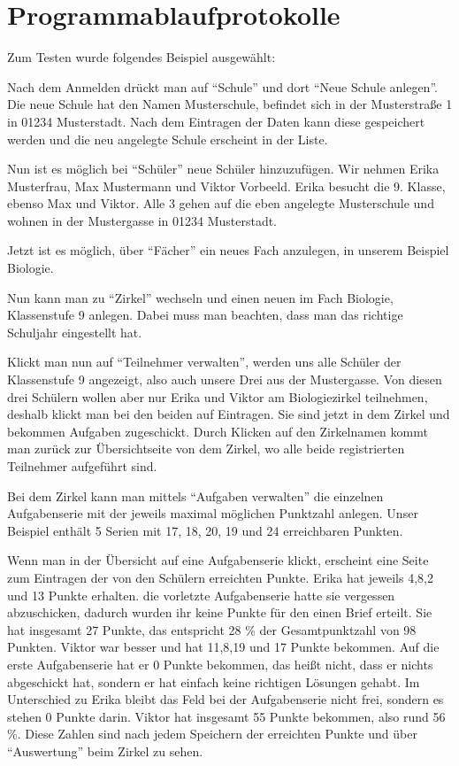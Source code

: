 \chapter{Programmablaufprotokolle}

Zum Testen wurde folgendes Beispiel ausgewählt:

Nach dem Anmelden drückt man auf "`Schule"' und dort "`Neue Schule anlegen"'. Die neue Schule hat den Namen Musterschule, befindet sich in der Musterstraße 1 in 01234 Musterstadt. Nach dem Eintragen der Daten kann diese gespeichert werden und die neu angelegte Schule erscheint in der Liste. 

Nun ist es möglich bei "`Schüler"' neue Schüler hinzuzufügen. Wir nehmen Erika Musterfrau, Max Mustermann und Viktor Vorbeeld. Erika besucht die 9. Klasse, ebenso Max und Viktor. Alle 3 gehen auf die eben angelegte Musterschule und wohnen in der Mustergasse in 01234 Musterstadt. 

Jetzt ist es möglich, über "`Fächer"' ein neues Fach anzulegen, in unserem Beispiel Biologie. 

Nun kann man zu "`Zirkel"' wechseln und einen neuen im Fach Biologie, Klassenstufe 9 anlegen. Dabei muss man beachten, dass man das richtige Schuljahr eingestellt hat.

Klickt man nun auf "`Teilnehmer verwalten"', werden uns alle Schüler der Klassenstufe 9 angezeigt, also auch unsere Drei aus der Mustergasse. Von diesen drei Schülern wollen aber nur Erika und Viktor am Biologiezirkel teilnehmen, deshalb klickt man bei den beiden auf Eintragen. Sie sind jetzt in dem Zirkel und bekommen Aufgaben zugeschickt. Durch Klicken auf den Zirkelnamen kommt man zurück zur Übersichtseite von dem Zirkel, wo alle beide registrierten Teilnehmer aufgeführt sind.

Bei dem Zirkel kann man mittels "`Aufgaben verwalten"' die einzelnen Aufgabenserie mit der jeweils maximal möglichen Punktzahl anlegen. Unser Beispiel enthält 5 Serien mit 17, 18, 20, 19 und 24 erreichbaren Punkten. 

Wenn man in der Übersicht auf eine Aufgabenserie klickt, erscheint eine Seite zum Eintragen der von den Schülern erreichten Punkte. Erika hat jeweils 4,8,2 und 13 Punkte erhalten. die vorletzte Aufgabenserie hatte sie vergessen abzuschicken, dadurch wurden ihr keine Punkte für den einen Brief erteilt. Sie hat insgesamt 27 Punkte, das entspricht 28 \% der Gesamtpunktzahl von 98 Punkten. Viktor war besser und hat 11,8,19 und 17 Punkte bekommen. Auf die erste Aufgabenserie hat er 0 Punkte bekommen, das heißt nicht, dass er nichts abgeschickt hat, sondern er hat einfach keine richtigen Lösungen gehabt. Im Unterschied zu Erika bleibt das Feld bei der Aufgabenserie nicht frei, sondern es stehen 0 Punkte darin. Viktor hat insgesamt 55 Punkte bekommen, also rund 56 \%. Diese Zahlen sind nach jedem Speichern der erreichten Punkte und über "`Auswertung"' beim Zirkel zu sehen.

